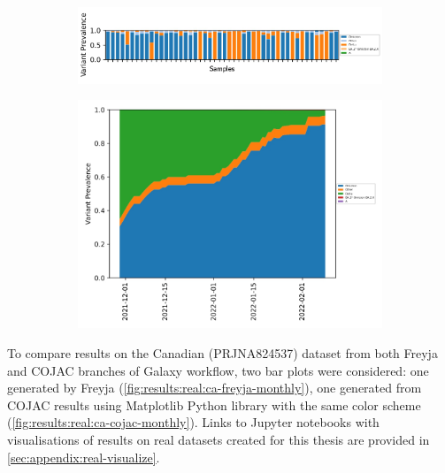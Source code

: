     \begin{figure}[H]
        \centering
        \begin{subfigure}[b]{1\textwidth}
        \includegraphics[width=1\textwidth]{figures/results/real/ca-freyja-samples.png}
        \label{fig:results:real:ca-freyja-samples}
        \end{subfigure}
        \hfill
        \begin{subfigure}[b]{0.8\textwidth}
        \includegraphics[width=1\textwidth]{figures/results/real/ca-freyja-daily.jpg}
        \label{fig:results:real:ca-freyja-daily}
        \end{subfigure}
        \hfill
    \end{figure}
    
    To compare results on the Canadian (PRJNA824537) dataset from both Freyja and COJAC branches of Galaxy workflow, two bar plots were considered: one generated by Freyja (\cref{fig:results:real:ca-freyja-monthly}), one generated from COJAC results using Matplotlib Python library with the same color scheme (\cref{fig:results:real:ca-cojac-monthly}). Links to Jupyter notebooks with visualisations of results on real datasets created for this thesis are provided in \cref{sec:appendix:real-visualize}.
    
